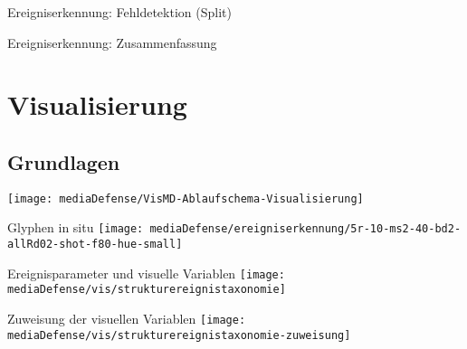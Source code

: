 \documentclass[10pt]{beamer}
\begin{document}
\begin{wideframe}Ereigniserkennung: Fehldetektion (Split)
	
\end{wideframe}

\begin{wideframe}Ereigniserkennung: Zusammenfassung
	
\end{wideframe}

\section{Visualisierung}

\subsection{Grundlagen}
\begin{wideframe}
	\texttt{[image: mediaDefense/VisMD-Ablaufschema-Visualisierung]}
\end{wideframe}

\begin{frame}{Glyphen in situ}
	\texttt{[image: mediaDefense/ereigniserkennung/5r-10-ms2-40-bd2-allRd02-shot-f80-hue-small]}
\end{frame}

%
%
\begin{frame}{Ereignisparameter und visuelle Variablen}
	\texttt{[image: mediaDefense/vis/strukturereignistaxonomie]}
\end{frame}

%
%
\begin{frame}{Zuweisung der visuellen Variablen}
	\texttt{[image: mediaDefense/vis/strukturereignistaxonomie-zuweisung]}
\end{frame}
\end{document}
